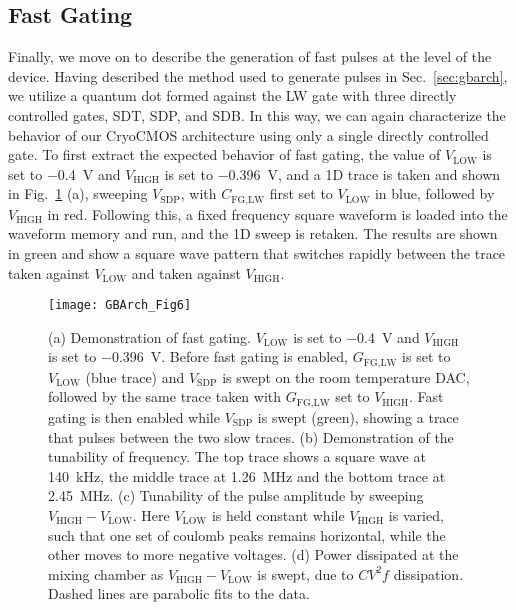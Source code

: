 \subsection{Fast Gating}
Finally, we move on to describe the generation of fast pulses at the level of the device. Having described the method used to generate pulses in Sec.~\ref{sec:gbarch}, we utilize a quantum dot formed against the LW gate with three directly controlled gates, SDT, SDP, and SDB. In this way, we can again characterize the behavior of our CryoCMOS architecture using only a single directly controlled gate. To first extract the expected behavior of fast gating, the value of $V_\textrm{LOW}$ is set to \SI{-0.4}{\volt} and $V_\textrm{HIGH}$ is set to \SI{-0.396}{\volt}, and a 1D trace is taken and shown in Fig.~\ref{fig:gbfg} (a), sweeping $V_\textrm{SDP}$, with $C_\textrm{FG,LW}$ first set to $V_\textrm{LOW}$ in blue, followed by $V_\textrm{HIGH}$ in red. Following this, a fixed frequency square waveform is loaded into the waveform memory and run, and the 1D sweep is retaken. The results are shown in green and show a square wave pattern that switches rapidly between the trace taken against $V_\textrm{LOW}$ and taken against $V_\textrm{HIGH}$.

\begin{figure}
  \texttt{[image: GBArch\_Fig6]}
  \caption[Characterization of fast gating]
  {\label{fig:gbfg} (a) Demonstration of fast gating. $V_\textrm{LOW}$ is set to \SI{-0.4}{\volt} and $V_\textrm{HIGH}$ is set to \SI{-0.396}{\volt}. Before fast gating is enabled, $G_\textrm{FG,LW}$ is set to $V_\textrm{LOW}$ (blue trace) and $V_\textrm{SDP}$ is swept on the room temperature DAC, followed by the same trace taken with $G_\textrm{FG,LW}$ set to $V_\textrm{HIGH}$. Fast gating is then enabled while $V_\textrm{SDP}$ is swept (green), showing a trace that pulses between the two slow traces. (b) Demonstration of the tunability of frequency. The top trace shows a square wave at \SI{140}{\kilo\hertz}, the middle trace at \SI{1.26}{\mega\hertz} and the bottom trace at \SI{2.45}{\mega\hertz}. (c) Tunability of the
  pulse amplitude by sweeping $V_\textrm{HIGH} - V_\textrm{LOW}$. Here $V_\textrm{LOW}$ is held constant while $V_\textrm{HIGH}$ is varied, such that one set of coulomb peaks remains
  horizontal, while the other moves to more negative voltages. (d) Power dissipated at the mixing chamber as $V_\textrm{HIGH} - V_\textrm{LOW}$ is swept, due to $CV^2f$ dissipation. Dashed lines are parabolic fits to the data.}
\end{figure}

